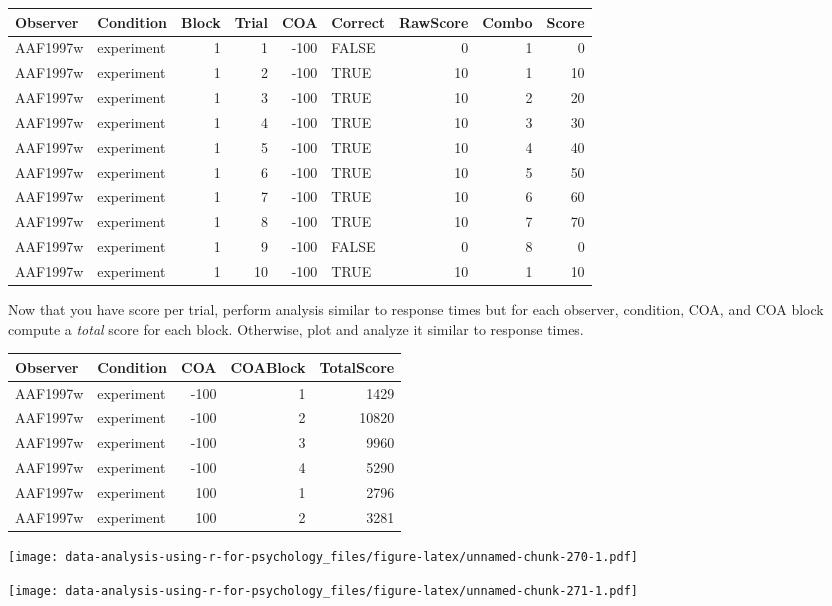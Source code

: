\documentclass[
]{book}
\begin{document}
\begin{tabular}{l|l|r|r|r|l|r|r|r}
\hline
Observer & Condition & Block & Trial & COA & Correct & RawScore & Combo & Score\\
\hline
AAF1997w & experiment & 1 & 1 & -100 & FALSE & 0 & 1 & 0\\
\hline
AAF1997w & experiment & 1 & 2 & -100 & TRUE & 10 & 1 & 10\\
\hline
AAF1997w & experiment & 1 & 3 & -100 & TRUE & 10 & 2 & 20\\
\hline
AAF1997w & experiment & 1 & 4 & -100 & TRUE & 10 & 3 & 30\\
\hline
AAF1997w & experiment & 1 & 5 & -100 & TRUE & 10 & 4 & 40\\
\hline
AAF1997w & experiment & 1 & 6 & -100 & TRUE & 10 & 5 & 50\\
\hline
AAF1997w & experiment & 1 & 7 & -100 & TRUE & 10 & 6 & 60\\
\hline
AAF1997w & experiment & 1 & 8 & -100 & TRUE & 10 & 7 & 70\\
\hline
AAF1997w & experiment & 1 & 9 & -100 & FALSE & 0 & 8 & 0\\
\hline
AAF1997w & experiment & 1 & 10 & -100 & TRUE & 10 & 1 & 10\\
\hline
\end{tabular}

Now that you have score per trial, perform analysis similar to response times but for each observer, condition, COA, and COA block compute a \emph{total} score for each block. Otherwise, plot and analyze it similar to response times.

\begin{tabular}{l|l|r|r|r}
\hline
Observer & Condition & COA & COABlock & TotalScore\\
\hline
AAF1997w & experiment & -100 & 1 & 1429\\
\hline
AAF1997w & experiment & -100 & 2 & 10820\\
\hline
AAF1997w & experiment & -100 & 3 & 9960\\
\hline
AAF1997w & experiment & -100 & 4 & 5290\\
\hline
AAF1997w & experiment & 100 & 1 & 2796\\
\hline
AAF1997w & experiment & 100 & 2 & 3281\\
\hline
\end{tabular}

\texttt{[image: data-analysis-using-r-for-psychology\_files/figure-latex/unnamed-chunk-270-1.pdf]}

\texttt{[image: data-analysis-using-r-for-psychology\_files/figure-latex/unnamed-chunk-271-1.pdf]}
\end{document}
